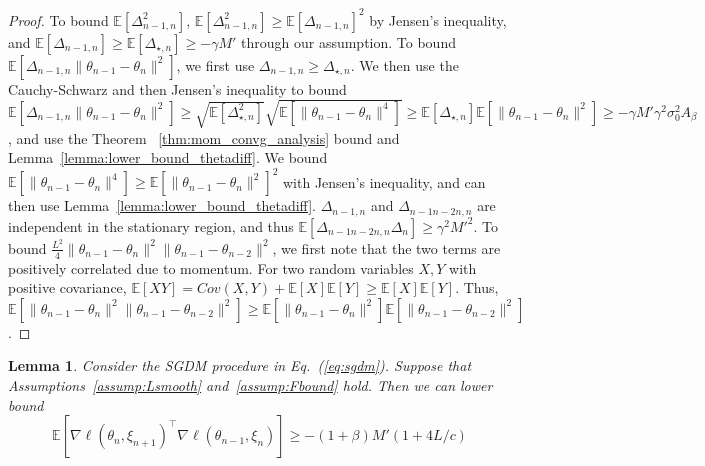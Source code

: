 \documentclass[conference]{IEEEtran}
\newcommand{\Ex}[1]{\mathbb{E}[ #1 ]}
\newtheorem{lemma}[theorem]{Lemma}
\begin{document}
\begin{proof}
To bound $\Ex{ \Delta_{n-1,n}^2 }$, $\Ex{ \Delta_{n-1,n}^2 } \geq \Ex{ \Delta_{n-1,n} }^2$ by Jensen's inequality, and $\Ex{ \Delta_{n-1,n} } \geq \Ex{ \Delta_{\star, n} } \geq - \gamma M'$ through our assumption.
To bound $\Ex{ \Delta_{n-1, n}  \| \theta_{n-1} - \theta_n \|^2 }$, we first use $\Delta_{n-1,n} \geq \Delta_{\star,n}$.
We then use the Cauchy-Schwarz and then Jensen's inequality to bound $\Ex{ \Delta_{n-1, n}  \| \theta_{n-1} - \theta_n \|^2 } \geq \sqrt{ \Ex{ \Delta_{\star, n}^2 } } \sqrt{ \Ex{ \| \theta_{n-1} - \theta_n \|^4 } } \geq \Ex{ \Delta_{\star, n} } \Ex{ \| \theta_{n-1} - \theta_n \|^2 } \geq - \gamma M' \gamma^2 \sigma_0^2 A_\beta$,
and use the Theorem~ \ref{thm:mom_convg_analysis} 
bound and Lemma~\ref{lemma:lower_bound_thetadiff}.
We bound $\Ex{ \| \theta_{n-1} - \theta_n \|^4 } \geq \Ex{ \| \theta_{n-1} - \theta_n \|^2 }^2$ with Jensen's inequality, and can then use Lemma~\ref{lemma:lower_bound_thetadiff}.
$\Delta_{n-1,n}$ and $\Delta_{n-1n-2n, n}$ are independent in the stationary region, and thus $\Ex{ \Delta_{n-1n-2n, n} \Delta_{n}} \geq \gamma^2 M'^2$.
To bound $ \frac{L^2}{4} \| \theta_{n-1} - \theta_n \|^2 \| \theta_{n-1} - \theta_{n-2}\|^2$, we first note that the two terms are positively correlated due to momentum.
For two random variables $X, Y$ with positive covariance, $\Ex {X Y } = Cov (X , Y ) + \Ex{X} \Ex{Y} \geq \Ex{X} \Ex{Y}$.
Thus, $\Ex{ \| \theta_{n-1} - \theta_n \|^2 \| \theta_{n-1} - \theta_{n-2}\|^2} \geq \Ex{ \| \theta_{n-1} - \theta_n \|^2 } \Ex{ \| \theta_{n-1} - \theta_{n-2}\|^2}$.
\end{proof}


\begin{lemma}
\label{lemma:exp_ip_lower}
Consider the SGDM procedure in Eq.~(\ref{eq:sgdm}). 
Suppose that Assumptions~\ref{assump:Lsmooth} and~\ref{assump:Fbound} hold. Then we can lower bound
\begin{equation*}
\mathbb{E}[ \nabla \ell ( \theta_n, \xi_{n+1} )^\top \nabla \ell ( \theta_{n-1}, \xi_n ) ] \geq 
- (1 + \beta ) M' (1 + 4L/c )
\end{equation*}
\end{lemma}
\end{document}
